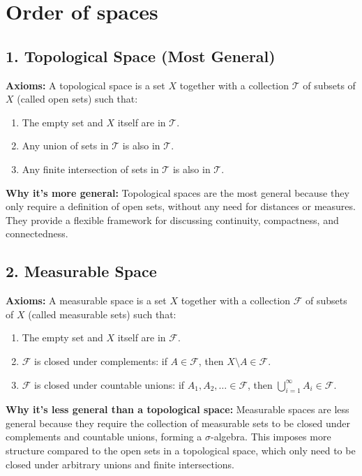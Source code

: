 \documentclass[11pt]{book}
\numberwithin{equation}{chapter}
\theoremstyle{boldStyle}
\begin{document}
\section{Order of spaces}

\subsection{1. Topological Space (Most General)}

\textbf{Axioms:} A topological space is a set \( X \) together with a collection \( \mathcal{T} \) of subsets of \( X \) (called open sets) such that:
\begin{enumerate}
    \item The empty set and \( X \) itself are in \( \mathcal{T} \).
    \item Any union of sets in \( \mathcal{T} \) is also in \( \mathcal{T} \).
    \item Any finite intersection of sets in \( \mathcal{T} \) is also in \( \mathcal{T} \).
\end{enumerate}

\textbf{Why it's more general:} Topological spaces are the most general because they only require a definition of open sets, without any need for distances or measures. They provide a flexible framework for discussing continuity, compactness, and connectedness.

\vspace{10pt}

\subsection*{2. Measurable Space}

\textbf{Axioms:} A measurable space is a set \( X \) together with a collection \( \mathcal{F} \) of subsets of \( X \) (called measurable sets) such that:
\begin{enumerate}
    \item The empty set and \( X \) itself are in \( \mathcal{F} \).
    \item \( \mathcal{F} \) is closed under complements: if \( A \in \mathcal{F} \), then \( X \setminus A \in \mathcal{F} \).
    \item \( \mathcal{F} \) is closed under countable unions: if \( A_1, A_2, \ldots \in \mathcal{F} \), then \( \bigcup_{i=1}^\infty A_i \in \mathcal{F} \).
\end{enumerate}

\textbf{Why it's less general than a topological space:} Measurable spaces are less general because they require the collection of measurable sets to be closed under complements and countable unions, forming a \(\sigma\)-algebra. This imposes more structure compared to the open sets in a topological space, which only need to be closed under arbitrary unions and finite intersections.
\end{document}
